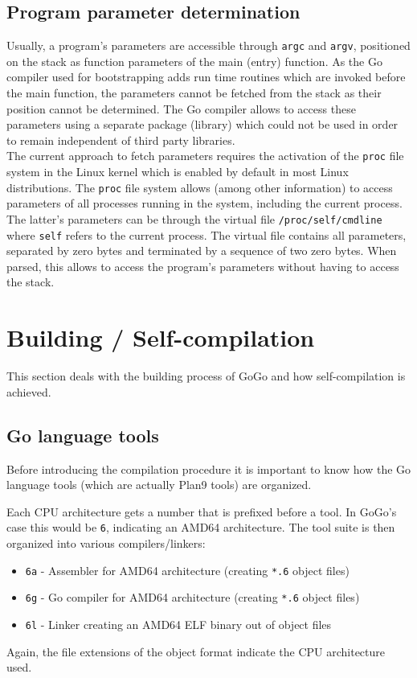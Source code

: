 \documentclass[a4paper]{scrartcl}
\let\chapter\section
\let\section\subsection
\let\subsection\subsubsection
\let\subsubsection\paragraph
\let\paragraph\subparagraph
\let\subparagraph\undefined
\begin{document}
    \section{Program parameter determination}
      Usually, a program's parameters are accessible through \texttt{argc} and \texttt{argv}, positioned on the stack as function parameters of the main (entry) function. As the Go compiler used for bootstrapping adds run time routines which are invoked before the main function, the parameters cannot be fetched from the stack as their position cannot be determined. The Go compiler allows to access these parameters using a separate package (library) which could not be used in order to remain independent of third party libraries.\\
      The current approach to fetch parameters requires the activation of the \texttt{proc} file system in the Linux kernel which is enabled by default in most Linux distributions\cite{var06}. The \texttt{proc} file system allows (among other information) to access parameters of all processes running in the system, including the current process. The latter's parameters can be through the virtual file \texttt{/proc/self/cmdline} where \texttt{self} refers to the current process. The virtual file contains all parameters, separated by zero bytes and terminated by a sequence of two zero bytes. When parsed, this allows to access the program's parameters without having to access the stack.
	
  \chapter{Building / Self-compilation}
  \label{chpt:building}
    This section deals with the building process of GoGo and how self-compilation 
    is achieved.

    \section{Go language tools}
      Before introducing the compilation procedure it is important to know how
      the Go language tools (which are actually Plan9 tools) are organized.

      Each CPU architecture gets a number that is prefixed before a tool. In
      GoGo's case this would be \texttt{6}, indicating an AMD64 architecture.
      The tool suite is then organized into various compilers/linkers:
      \begin{itemize}
        \item \texttt{6a} - Assembler for AMD64 architecture (creating \texttt{*.6} 
          object files)
        \item \texttt{6g} - Go compiler for AMD64 architecture (creating \texttt{*.6}
          object files)
        \item \texttt{6l} - Linker creating an AMD64 ELF binary out of object files
      \end{itemize}
      Again, the file extensions of the object format indicate the CPU
      architecture used.
\end{document}
